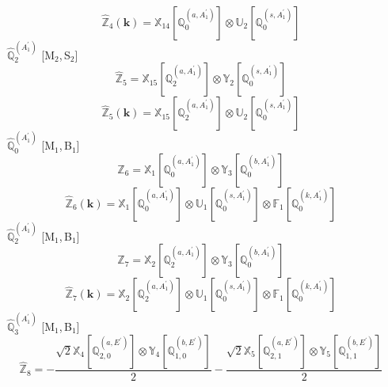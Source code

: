 \documentclass[fleqn,10pt,landscape]{article}
\begin{document}
\begin{itemize}
\begin{dmath*}
\end{dmath*}
\begin{dmath*}
\hat{\mathbb{Z}}_{4}(\bm{k})=\mathbb{X}_{14}[\mathbb{Q}_{0}^{(a,A_{1}^{\prime})}] \otimes\mathbb{U}_{2}[\mathbb{Q}_{0}^{(s,A_{1}^{\prime})}]
\end{dmath*}
\vspace{4mm}
\noindent {} $\,\,\,\hat{\mathbb{Q}}_{2}^{(A_{1}^{\prime})}$ [M$_{2}$,\,S$_{2}$]
\begin{dmath*}
\hat{\mathbb{Z}}_{5}=\mathbb{X}_{15}[\mathbb{Q}_{2}^{(a,A_{1}^{\prime})}] \otimes\mathbb{Y}_{2}[\mathbb{Q}_{0}^{(s,A_{1}^{\prime})}]
\end{dmath*}
\begin{dmath*}
\hat{\mathbb{Z}}_{5}(\bm{k})=\mathbb{X}_{15}[\mathbb{Q}_{2}^{(a,A_{1}^{\prime})}] \otimes\mathbb{U}_{2}[\mathbb{Q}_{0}^{(s,A_{1}^{\prime})}]
\end{dmath*}
\vspace{4mm}
\noindent {} $\,\,\,\hat{\mathbb{Q}}_{0}^{(A_{1}^{\prime})}$ [M$_{1}$,\,B$_{1}$]
\begin{dmath*}
\hat{\mathbb{Z}}_{6}=\mathbb{X}_{1}[\mathbb{Q}_{0}^{(a,A_{1}^{\prime})}] \otimes\mathbb{Y}_{3}[\mathbb{Q}_{0}^{(b,A_{1}^{\prime})}]
\end{dmath*}
\begin{dmath*}
\hat{\mathbb{Z}}_{6}(\bm{k})=\mathbb{X}_{1}[\mathbb{Q}_{0}^{(a,A_{1}^{\prime})}] \otimes\mathbb{U}_{1}[\mathbb{Q}_{0}^{(s,A_{1}^{\prime})}] \otimes\mathbb{F}_{1}[\mathbb{Q}_{0}^{(k,A_{1}^{\prime})}]
\end{dmath*}
\vspace{4mm}
\noindent {} $\,\,\,\hat{\mathbb{Q}}_{2}^{(A_{1}^{\prime})}$ [M$_{1}$,\,B$_{1}$]
\begin{dmath*}
\hat{\mathbb{Z}}_{7}=\mathbb{X}_{2}[\mathbb{Q}_{2}^{(a,A_{1}^{\prime})}] \otimes\mathbb{Y}_{3}[\mathbb{Q}_{0}^{(b,A_{1}^{\prime})}]
\end{dmath*}
\begin{dmath*}
\hat{\mathbb{Z}}_{7}(\bm{k})=\mathbb{X}_{2}[\mathbb{Q}_{2}^{(a,A_{1}^{\prime})}] \otimes\mathbb{U}_{1}[\mathbb{Q}_{0}^{(s,A_{1}^{\prime})}] \otimes\mathbb{F}_{1}[\mathbb{Q}_{0}^{(k,A_{1}^{\prime})}]
\end{dmath*}
\vspace{4mm}
\noindent {} $\,\,\,\hat{\mathbb{Q}}_{3}^{(A_{1}^{\prime})}$ [M$_{1}$,\,B$_{1}$]
\begin{dmath*}
\hat{\mathbb{Z}}_{8}=- \frac{\sqrt{2} \mathbb{X}_{4}[\mathbb{Q}_{2,0}^{(a,E^{\prime})}] \otimes\mathbb{Y}_{4}[\mathbb{Q}_{1,0}^{(b,E^{\prime})}]}{2} - \frac{\sqrt{2} \mathbb{X}_{5}[\mathbb{Q}_{2,1}^{(a,E^{\prime})}] \otimes\mathbb{Y}_{5}[\mathbb{Q}_{1,1}^{(b,E^{\prime})}]}{2}

\end{dmath*}
\end{itemize}
\end{document}
